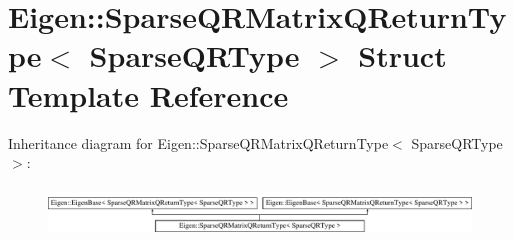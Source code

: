 \hypertarget{struct_eigen_1_1_sparse_q_r_matrix_q_return_type}{}\section{Eigen\+:\+:Sparse\+Q\+R\+Matrix\+Q\+Return\+Type$<$ Sparse\+Q\+R\+Type $>$ Struct Template Reference}
\label{struct_eigen_1_1_sparse_q_r_matrix_q_return_type}
Inheritance diagram for Eigen\+:\+:Sparse\+Q\+R\+Matrix\+Q\+Return\+Type$<$ Sparse\+Q\+R\+Type $>$\+:\begin{figure}[H]
\begin{center}
\leavevmode
\includegraphics[height=1.333333cm]{struct_eigen_1_1_sparse_q_r_matrix_q_return_type}
\end{center}
\end{figure}
